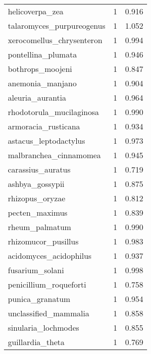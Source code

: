\begin{tabular}{lrr}
                helicoverpa\_zea &                   1 &     0.916 \\
      talaromyces\_purpureogenus &                   1 &     1.052 \\
      xerocomellus\_chrysenteron &                   1 &     0.994 \\
             pontellina\_plumata &                   1 &     0.946 \\
               bothrops\_moojeni &                   1 &     0.847 \\
               anemonia\_manjano &                   1 &     0.904 \\
               aleuria\_aurantia &                   1 &     0.964 \\
       rhodotorula\_mucilaginosa &                   1 &     0.990 \\
            armoracia\_rusticana &                   1 &     0.934 \\
          astacus\_leptodactylus &                   1 &     0.973 \\
         malbranchea\_cinnamomea &                   1 &     0.945 \\
              carassius\_auratus &                   1 &     0.719 \\
                ashbya\_gossypii &                   1 &     0.875 \\
                rhizopus\_oryzae &                   1 &     0.812 \\
                 pecten\_maximus &                   1 &     0.839 \\
                 rheum\_palmatum &                   1 &     0.990 \\
            rhizomucor\_pusillus &                   1 &     0.983 \\
         acidomyces\_acidophilus &                   1 &     0.937 \\
                fusarium\_solani &                   1 &     0.998 \\
         penicillium\_roqueforti &                   1 &     0.758 \\
                punica\_granatum &                   1 &     0.954 \\
          unclassified\_mammalia &                   1 &     0.858 \\
            sinularia\_lochmodes &                   1 &     0.855 \\
               guillardia\_theta &                   1 &     0.769 \\

\end{tabular}
